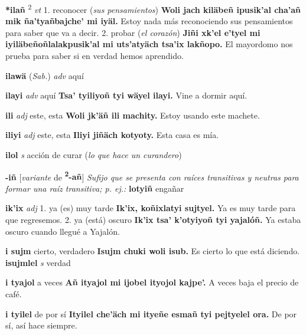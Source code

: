 \documentclass[10pt]{scrbook}
\newcommand{\entry}[1]{\textbf{#1}}
\newcommand{\onedefinition}[1]{#1.}
\newcommand{\defsuperscript}[1]{\textsuperscript{#1}}
\newcommand{\nontranslationdef}[1]{\textit{#1}}
\newcommand{\partofspeech}[1]{\textit{#1}}
\newcommand{\spanishtranslation}[1]{#1}
\newcommand{\clarification}[1]{(\textit{#1})}
\newcommand{\cholexample}[1]{\textbf{#1}}
\newcommand{\exampletranslation}[1]{#1}
\newcommand{\relevantdialect}[1]{(\textit{#1})}
\newcommand{\secondaryentry}[1]{\\\textbf{#1}}
\newcommand{\secondpartofspeech}[1]{\textit{#1}}
\newcommand{\secondtranslation}[1]{#1}
\newcommand{\conjugationtense}[1]{[\textit{#1}}
\newcommand{\conjugationverb}[1]{de \textbf{#1}]}
\begin{document}
\begin{multicols}{2}
\entry{*ilañ}
\defsuperscript{2}
\partofspeech{vt}
\onedefinition{1}
\spanishtranslation{reconocer}
\clarification{sus pensamientos}
\cholexample{Woli jach kiläbeñ ipusik'al cha'añ mik ña'tyañbajche' mi iyäl.}
\exampletranslation{Estoy nada más reconociendo sus pensamientos para saber que va a decir.}
\onedefinition{2}
\spanishtranslation{probar}
\clarification{el corazón}
\cholexample{Jiñi xk'el e'tyel mi iyiläbeñoñlalakpusik'al mi uts'atyäch tsa'ix lakñopo.}
\exampletranslation{El mayordomo nos prueba para saber si en verdad hemos aprendido.}

\entry{ilawä}
\relevantdialect{Sab.}
\partofspeech{adv}
\spanishtranslation{aquí}

\entry{ilayi}
\partofspeech{adv}
\spanishtranslation{aquí}
\cholexample{Tsa' tyiliyoñ tyi wäyel ilayi.}
\exampletranslation{Vine a dormir aquí.}

\entry{ili}
\partofspeech{adj}
\spanishtranslation{este, esta}
\cholexample{Woli jk'äñ ili machity.}
\exampletranslation{Estoy usando este machete.}

\entry{iliyi}
\partofspeech{adj}
\spanishtranslation{este, esta}
\cholexample{Iliyi jiñäch kotyoty.}
\exampletranslation{Esta casa es mía.}

\entry{ilol}
\partofspeech{s}
\spanishtranslation{acción de curar}
\clarification{lo que hace un curandero}

\entry{-iñ}
\conjugationtense{variante}
\conjugationverb{\textsuperscript{2}-añ}
\nontranslationdef{Sufijo que se presenta con raíces transitivas y neutras para formar una raíz transitiva; p. ej.:}
\cholexample{lotyiñ}
\exampletranslation{engañar}

\entry{ik'ix}
\partofspeech{adj}
\onedefinition{1}
\spanishtranslation{ya (es) muy tarde}
\cholexample{Ik'ix, koñixlatyi sujtyel.}
\exampletranslation{Ya es muy tarde para que regresemos.}
\onedefinition{2}
\spanishtranslation{ya (está) oscuro}
\cholexample{Ik'ix tsa' k'otyiyoñ tyi yajalóñ.}
\exampletranslation{Ya estaba oscuro cuando llegué a Yajalón.}

\entry{i sujm}
\spanishtranslation{cierto, verdadero}
\cholexample{Isujm chuki woli isub.}
\exampletranslation{Es cierto lo que está diciendo.}
\secondaryentry{isujmlel}
\secondpartofspeech{s}
\secondtranslation{verdad}

\entry{i tyajol}
\spanishtranslation{a veces}
\cholexample{Añ ityajol mi ijobel ityojol kajpe'.}
\exampletranslation{A veces baja el precio de café.}

\entry{i tyilel}
\spanishtranslation{de por sí}
\cholexample{Ityilel che'äch mi ityeñe esmañ tyi pejtyelel ora.}
\exampletranslation{De por sí, así hace siempre.}


\end{multicols}
\end{document}
